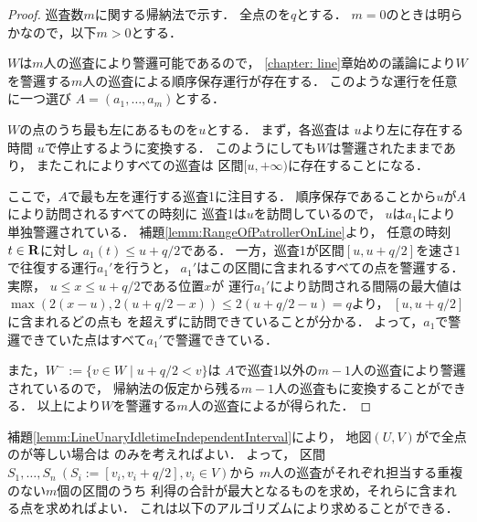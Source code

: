 \begin{proof}
  \newcommand{\leftmostpoint}{u}  %
  \newcommand{\leftmostpatroller}{巡査1}

  巡査数$m$に関する帰納法で示す．
  全点の{\maxIdletime}を$q$とする．
  $m = 0$のときは明らかなので，以下$m > 0$とする．

  $W$は$m$人の巡査により警邏可能であるので，
  \ref{chapter: line}章始めの議論により$W$を警邏する$m$人の巡査による順序保存運行が存在する．
  このような運行を任意に一つ選び
  $A = (a_1, \ldots, a_m)$とする．

  $W$の点のうち最も左にあるものを$\leftmostpoint$とする．
  まず，各巡査は
  $\leftmostpoint$より左に存在する時間
  $\leftmostpoint$で停止するように変換する．
  このようにしても$W$は警邏されたままであり，
  またこれによりすべての巡査は
  区間$[\leftmostpoint, +\infty)$に存在することになる．

  ここで，$A$で最も左を運行する{\leftmostpatroller}に注目する．
  順序保存であることから$\leftmostpoint$が$A$により訪問されるすべての時刻に
  {\leftmostpatroller}は$\leftmostpoint$を訪問しているので，
  $\leftmostpoint$は$a_1$により単独警邏されている．
  補題\ref{lemm:RangeOfPatrollerOnLine}より，
  任意の時刻$t \in \mathbf R$に対し
  $a_1(t) \leq \leftmostpoint + q/2$である．
  一方，{\leftmostpatroller}が区間$[\leftmostpoint, \leftmostpoint + q/2]$を速さ$1$で往復する運行$a_1'$を行うと，
  $a_1'$はこの区間に含まれるすべての点を警邏する．
  実際，
  $\leftmostpoint \leq x \leq \leftmostpoint + q/2$である位置$x$が
  運行$a_1'$により訪問される間隔の最大値は
  $ \max( 2(x - \leftmostpoint), 2(\leftmostpoint + q/2 - x) )
    \leq 2(\leftmostpoint + q/2 - \leftmostpoint) = q$より，
    $[\leftmostpoint, \leftmostpoint + q/2]$に含まれるどの点も
  {\maxIdletime}を超えずに訪問できていることが分かる．
  よって，$a_1$で警邏できていた点はすべて$a_1'$で警邏できている．

  また，$W^- := \{ v \in W \mid \leftmostpoint + q/2 < v \}$は
  $A$で{\leftmostpatroller}以外の$m - 1$人の巡査により警邏されているので，
  帰納法の仮定から残る$m - 1$人の巡査も{\indSectOperation}に変換することができる．
  以上により$W$を警邏する$m$人の巡査による{\indSectOperation}が得られた．
\end{proof}


補題\ref{lemm:LineUnaryIdletimeIndependentInterval}により，
地図$(U, V)$が{\graphLine}で全点の{\maxIdletime}が等しい場合は
{\indSectOperation}のみを考えればよい．
よって，
区間$S_1, \ldots, S_n\ (S_i := [v_i, v_i + q/2], v_i \in V)$から
$m$人の巡査がそれぞれ担当する重複のない$m$個の区間のうち
利得の合計が最大となるものを求め，それらに含まれる点を求めればよい．
これは以下のアルゴリズムにより求めることができる．

